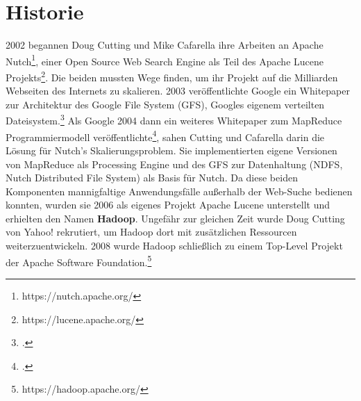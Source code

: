 \section{Historie}
2002 begannen Doug Cutting und Mike Cafarella ihre Arbeiten an Apache Nutch\footnote{https://nutch.apache.org/}, einer Open Source Web Search Engine als Teil des Apache Lucene Projekts\footnote{https://lucene.apache.org/}. Die beiden mussten Wege finden, um ihr Projekt auf die Milliarden Webseiten des Internets zu skalieren. 2003 veröffentlichte Google ein Whitepaper zur Architektur des Google File System (GFS), Googles eigenem verteilten Dateisystem.\footcite[The Google File System]{ghemawat_google_2003} Als Google 2004 dann ein weiteres Whitepaper zum MapReduce Programmiermodell veröffentlichte\footcite[MapReduce: Simplified Data Processing on Large Clusters]{dean_mapreduce_2004}, sahen Cutting und Cafarella darin die Lösung für Nutch's Skalierungsproblem. Sie implementierten eigene Versionen von MapReduce als Processing Engine und des GFS zur Datenhaltung (NDFS, Nutch Distributed File System) als Basis für Nutch. Da diese beiden Komponenten mannigfaltige Anwendungsfälle außerhalb der Web-Suche bedienen konnten, wurden sie 2006 als eigenes Projekt Apache Lucene unterstellt und erhielten den Namen \textbf{Hadoop}. Ungefähr zur gleichen Zeit wurde Doug Cutting von Yahoo! rekrutiert, um Hadoop dort mit zusätzlichen Ressourcen weiterzuentwickeln. 2008 wurde Hadoop schließlich zu einem Top-Level Projekt der Apache Software Foundation.\footnote{https://hadoop.apache.org/}\cite{cutting_next_2016}

\begin{comment}
\section{Hadoop Versionsverlauf}
\subsection{Hadoop 1.x}
Das NDFS wurde zum Hadoop Distributed File System (HDFS) weiterentwickelt.
MapReduce war die einzige Processing Engine $\rightarrow$ Nur große Java Applications
Scheduler der Single Point of Failure und Bottleneck

\subsection{Hadoop 2.x}
YARN als neue Ressourcenverwaltung
Hadoop auf Windows
Bottleneck behoben, aber auch Möglichkeit geschaffen, ganz andere Prozesse im Cluster laufen zu lassen
In dem Fall muss man Dateien selbst aufteilen

\subsection{Hadoop 3.x}
Erasure Coding in HDFS
Support for Microsoft Azure Data Lake and Aliyun Object Storage System filesystem connectors
YARN Resource Types
\end{comment}


